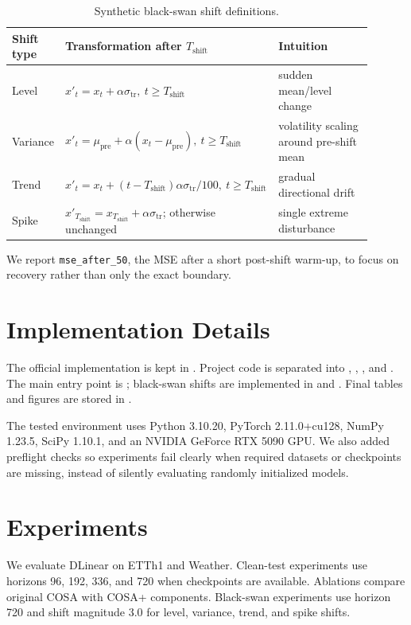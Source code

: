 \documentclass[10pt]{article}
\begin{document}
\begin{table}[h]
\centering
\small
\caption{Synthetic black-swan shift definitions.}
\begin{tabular}{p{0.12\linewidth}p{0.52\linewidth}p{0.26\linewidth}}
\toprule
Shift type & Transformation after $T_{\text{shift}}$ & Intuition \\
\midrule
Level & $x'_t=x_t+\alpha\sigma_{\mathrm{tr}},\ t\ge T_{\text{shift}}$ & sudden mean/level change \\
Variance & $x'_t=\mu_{\mathrm{pre}}+\alpha(x_t-\mu_{\mathrm{pre}}),\ t\ge T_{\text{shift}}$ & volatility scaling around pre-shift mean \\
Trend & $x'_t=x_t+(t-T_{\text{shift}})\alpha\sigma_{\mathrm{tr}}/100,\ t\ge T_{\text{shift}}$ & gradual directional drift \\
Spike & $x'_{T_{\text{shift}}}=x_{T_{\text{shift}}}+\alpha\sigma_{\mathrm{tr}}$; otherwise unchanged & single extreme disturbance \\
\bottomrule
\end{tabular}
\label{tab:shift_definitions}
\end{table}

We report \texttt{mse\_after\_50}, the MSE after a short post-shift warm-up, to focus on recovery rather than only the exact boundary.

\section{Implementation Details}
The official implementation is kept in . Project code is separated into , , , and . The main entry point is ; black-swan shifts are implemented in  and . Final tables and figures are stored in .

The tested environment uses Python 3.10.20, PyTorch 2.11.0+cu128, NumPy 1.23.5, SciPy 1.10.1, and an NVIDIA GeForce RTX 5090 GPU. We also added preflight checks so experiments fail clearly when required datasets or checkpoints are missing, instead of silently evaluating randomly initialized models.

\section{Experiments}
We evaluate DLinear on ETTh1 and Weather. Clean-test experiments use horizons 96, 192, 336, and 720 when checkpoints are available. Ablations compare original COSA with COSA+ components. Black-swan experiments use horizon 720 and shift magnitude 3.0 for level, variance, trend, and spike shifts.
\end{document}
